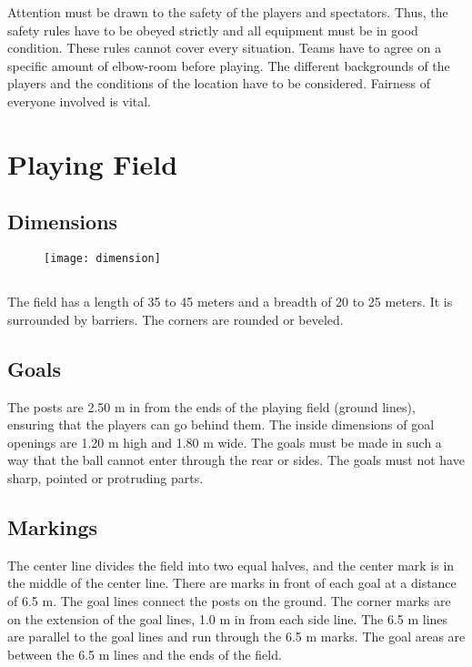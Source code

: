 
Attention must be drawn to the safety of the players and spectators.
Thus, the safety rules have to be obeyed strictly and all equipment must be in good condition.
These rules cannot cover every situation.
Teams have to agree on a specific amount of elbow-room before playing.
The different backgrounds of the players and the conditions of the location have to be considered.
Fairness of everyone involved is vital.

\section{Playing Field}

\subsection{Dimensions}

\begin{figure}[h]
\begin{center}
\texttt{[image: dimension]}
\end{center}
\end{figure}

\subsection{}
The field has a length of 35 to 45 meters and a breadth of 20 to 25 meters.
It is surrounded by barriers.
The corners are rounded or beveled.

\subsection{Goals}
The posts are 2.50 m in from the ends of the playing field (ground lines), ensuring that the players can go behind them.
The inside dimensions of goal openings are 1.20 m high and 1.80 m wide.
The goals must be made in such a way that the ball cannot enter through the rear or sides. The goals must not have sharp, pointed or protruding parts.

\subsection{Markings}
The center line divides the field into two equal halves, and the center mark is in the middle of the center line.
There are marks in front of each goal at a distance of 6.5 m.
The goal lines connect the posts on the ground.
The corner marks are on the extension of the goal lines, 1.0 m in from each side line.
The 6.5 m lines are parallel to the goal lines and run through the 6.5 m marks.
The goal areas are between the 6.5 m lines and the ends of the field.


